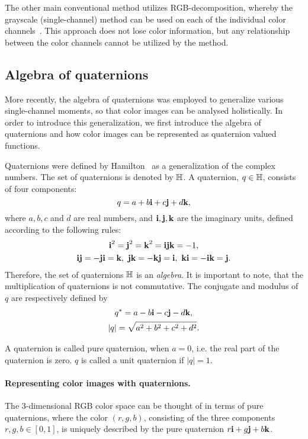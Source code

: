 The other main conventional method utilizes RGB-decomposition, whereby the grayscale (single-channel) method can be used on each of the individual color channels~\cite{affine_color}. This approach does not lose color information, but any relationship between the color channels cannot be utilized by the method.


\subsection{Algebra of quaternions}
More recently, the algebra of quaternions was employed to generalize various single-channel moments, so that color images can be analysed holistically. In order to introduce this generalization, we first introduce the algebra of quaternions and how color images can be represented as quaternion valued functions.


Quaternions were defined by Hamilton~\cite{Hamilton} as a generalization of the complex numbers. The set of quaternions is denoted by $\mathbb{H}$. A quaternion, $q \in \mathbb{H}$, consists of four components:
\[
	q = a+b\textbf{i} +c\textbf{j}+d\textbf{k},
\]
where $a,b,c$ and $d$ are real numbers, and $\textbf{i},\textbf{j},\textbf{k}$ are the imaginary units, defined according to the following rules:
\[
\begin{gathered}
	\textbf{i}^2 = \textbf{j}^2 = \textbf{k}^2 = \textbf{i}\textbf{j}\textbf{k} = -1,\\
	\textbf{i}\textbf{j} = -\textbf{j}\textbf{i} = \textbf{k},\ \textbf{j}\textbf{k} = -\textbf{k}\textbf{j} = \textbf{i},\ \textbf{k}\textbf{i} = -\textbf{i}\textbf{k} = \textbf{j}.
\end{gathered}
\]
Therefore, the set of quaternions $\mathbb{H}$ is an \textit{algebra}. It is important to note, that the multiplication of quaternions is not commutative. The conjugate and modulus of $q$ are respectively defined by
\[
\begin{gathered}
q^* = a-b\textbf{i}-c\textbf{j}-d\textbf{k}, \\
|q| = \sqrt{a^2+b^2+c^2+d^2}.
\end{gathered}
\]

A quaternion is called pure quaternion, when $a = 0$, i.e. the real part of the quaternion is zero. $q$ is called a unit quaternion if $|q| = 1$.

\paragraph{Representing color images with quaternions.}
The 3-dimensional RGB color space can be thought of in terms of pure quaternions, where the color $(r,g,b)$, consisting of the three components $r,g,b \in [0,1]$, is uniquely described by the pure quaternion $r\textbf{i} + g\textbf{j} + b\textbf{k}$.


